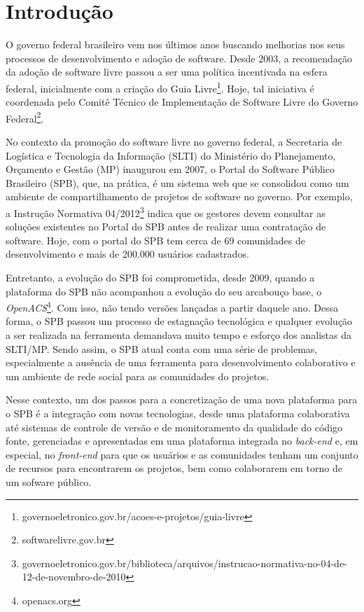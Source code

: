 \section{Introdução}
\label{sec:introducao}

O governo federal brasileiro vem nos últimos anos buscando melhorias nos
seus processos de desenvolvimento e adoção de software.
%
Desde 2003, a recomendação da adoção de software livre passou a ser uma política
incentivada na esfera federal, inicialmente com a criação do
Guia Livre\footnote{governoeletronico.gov.br/acoes-e-projetos/guia-livre}.
%
Hoje, tal iniciativa é coordenada pelo Comitê Técnico de Implementação de
Software Livre do Governo Federal\footnote{softwarelivre.gov.br}.


No contexto da promoção do software livre no governo federal, a
Secretaria de Logística e Tecnologia da Informação (SLTI) do Ministério do
Planejamento, Orçamento e Gestão (MP) inaugurou em 2007, o Portal do Software
Público Brasileiro (SPB), que, na prática, é um sistema web que se consolidou como
um ambiente de compartilhamento de projetos de software no governo.
%
Por exemplo, a Instrução Normativa
04/2012\footnote{governoeletronico.gov.br/biblioteca/arquivos/instrucao-normativa-no-04-de-12-de-novembro-de-2010}
indica que os gestores devem consultar as soluções existentes no Portal do SPB
antes de realizar uma contratação de software.
%
Hoje, com o portal do SPB tem cerca de 69 comunidades de
desenvolvimento e mais de 200.000 usuários cadastrados.

Entretanto, a evolução do SPB foi comprometida, desde 2009, quando a plataforma
do SPB não acompanhou a evolução do seu arcabouço base,
o \emph{OpenACS}\footnote{openacs.org}.
%
Com isso, não tendo versões lançadas a partir daquele ano.
%
Dessa forma, o SPB passou um processo de estagnação tecnológica e qualquer
evolução a ser realizada na ferramenta demandava muito tempo e esforço dos
analistas da SLTI/MP.
%
Sendo assim, o SPB atual conta com uma série de problemas, especialmente a
ausência de uma ferramenta para desenvolvimento colaborativo e um ambiente
de rede social para as comunidades do projetos.

Nesse contexto, um dos passos para a concretização de uma nova plataforma para o
SPB é a integração com novas tecnologias, desde uma plataforma colaborativa até sistemas
de controle de versão e de monitoramento da qualidade do código fonte,
gerenciadas e apresentadas em uma plataforma integrada no {\it back-end} e, em especial,
no {\it front-end} para que os usuários e as comunidades tenham um conjunto de
recursos para encontrarem os projetos, bem como colaborarem em torno de um
sofware público.


